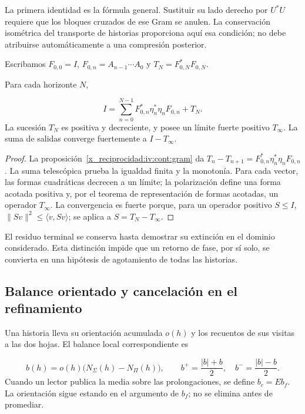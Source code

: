 La primera identidad es la fórmula general. Sustituir su lado derecho por \(U^*U\) requiere que los bloques cruzados de ese Gram se anulen. La conservación isométrica del transporte de historias proporciona aquí esa condición; no debe atribuirse automáticamente a una compresión posterior.

Escribamos \(F_{0,0}=I\), \(F_{0,n}=A_{n-1}\cdots A_0\) y \(T_N=F_{0,N}^*F_{0,N}\).

\begin{theorem}
\label{x_reciprocidad:iv:cont:terminal}
Para cada horizonte \(N\),

\[
I=\sum_{n=0}^{N-1}
F_{0,n}^*\eta_n^*\eta_nF_{0,n}+T_N.
\]
La sucesión \(T_N\) es positiva y decreciente, y posee un límite fuerte positivo \(T_\infty\). La suma de salidas converge fuertemente a \(I-T_\infty\).

\end{theorem}
\begin{proof}
La proposición~\ref{x_reciprocidad:iv:cont:gram} da \(T_n-T_{n+1}=F_{0,n}^*\eta_n^*\eta_nF_{0,n}\). La suma telescópica prueba la igualdad finita y la monotonía. Para cada vector, las formas cuadráticas decrecen a un límite; la polarización define una forma acotada positiva y, por el teorema de representación de formas acotadas, un operador \(T_\infty\). La convergencia es fuerte porque, para un operador positivo \(S\leq I\), \(\|Sv\|^2\leq\langle v,Sv\rangle\); se aplica a \(S=T_N-T_\infty\).
\end{proof}

El residuo terminal se conserva hasta demostrar su extinción en el dominio considerado. Esta distinción impide que un retorno de fase, por sí solo, se convierta en una hipótesis de agotamiento de todas las historias.

\subsection{Balance orientado y cancelación en el refinamiento}
\label{x_reciprocidad:iv:cont:balance}
Una historia lleva su orientación acumulada \(o(h)\) y los recuentos de sus visitas a las dos hojas. El balance local correspondiente es

\[
b(h)=o(h)\bigl(N_\Sigma(h)-N_\Pi(h)\bigr),
\qquad
b^+=\frac{|b|+b}{2},\quad b^-=\frac{|b|-b}{2}.
\]
Cuando un lector publica la media sobre las prolongaciones, se define \(b_c=Eb_f\). La orientación sigue estando en el argumento de \(b_f\); no se elimina antes de promediar.

